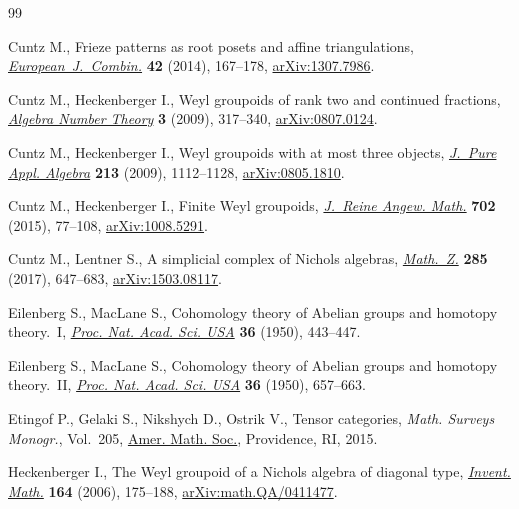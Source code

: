 \documentclass[10pt,a4paper]{amsart}
\numberwithin{equation}{section}
\begin{document}
\begin{thebibliography}{99}
\footnotesize\itemsep=0pt

Cuntz M., Frieze patterns as root posets and affine triangulations,
 \href{https://doi.org/10.1016/j.ejc.2014.06.005}{\textit{European~J.~Combin.}} \textbf{42} (2014), 167--178,
 \href{https://arxiv.org/abs/1307.7986}{arXiv:1307.7986}.

Cuntz M., Heckenberger I., Weyl groupoids of rank two and continued fractions,
 \href{https://doi.org/10.2140/ant.2009.3.317}{\textit{Algebra Number Theory}} \textbf{3} (2009), 317--340,
 \href{https://arxiv.org/abs/0807.0124}{arXiv:0807.0124}.

Cuntz M., Heckenberger I., Weyl groupoids with at most three objects,
 \href{https://doi.org/10.1016/j.jpaa.2008.11.009}{\textit{J.~Pure Appl. Algebra}} \textbf{213} (2009), 1112--1128,
 \href{https://arxiv.org/abs/0805.1810}{arXiv:0805.1810}.

Cuntz M., Heckenberger I., Finite {W}eyl groupoids, \href{https://doi.org/10.1515/crelle-2013-0033}{\textit{J.~Reine Angew.
 Math.}} \textbf{702} (2015), 77--108, \href{https://arxiv.org/abs/1008.5291}{arXiv:1008.5291}.

Cuntz M., Lentner S., A simplicial complex of {N}ichols algebras,
 \href{https://doi.org/10.1007/s00209-016-1711-0}{\textit{Math.~Z.}} \textbf{285} (2017), 647--683, \href{https://arxiv.org/abs/1503.08117}{arXiv:1503.08117}.

Eilenberg S., MacLane S., Cohomology theory of {A}belian groups and homotopy
 theory.~{I}, \href{https://doi.org/10.1073/pnas.36.8.443}{\textit{Proc. Nat. Acad. Sci. USA}} \textbf{36} (1950), 443--447.

Eilenberg S., MacLane S., Cohomology theory of {A}belian groups and homotopy
 theory.~{II}, \href{https://doi.org/10.1073/pnas.36.11.657}{\textit{Proc. Nat. Acad. Sci. USA}} \textbf{36} (1950),
 657--663.

Etingof P., Gelaki S., Nikshych D., Ostrik V., Tensor categories, \textit{Math.
 Surveys Monogr.}, Vol.~205, \href{https://doi.org/10.1090/surv/205}{Amer. Math. Soc.}, Providence, RI, 2015.

Heckenberger I., The {W}eyl groupoid of a {N}ichols algebra of diagonal type,
 \href{https://doi.org/10.1007/s00222-005-0474-8}{\textit{Invent. Math.}} \textbf{164} (2006), 175--188,
 \href{https://arxiv.org/abs/math.QA/0411477}{arXiv:math.QA/0411477}.


\end{thebibliography}
\end{document}
